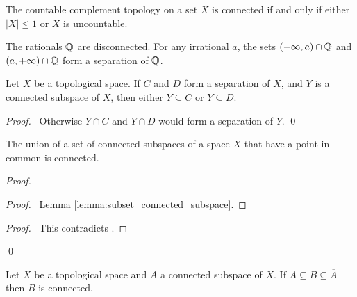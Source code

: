 \begin{example}
    The countable complement topology on a set $X$ is connected if and only if either $|X| \leq 1$ or $X$ is uncountable.
\end{example}

\begin{example}
    The rationals $\mathbb{Q}$ are disconnected. For any irrational $a$, the sets $(- \infty, a) \cap \mathbb{Q}$ and $(a, + \infty) \cap \mathbb{Q}$ form a separation of $\mathbb{Q}$.
\end{example}

\begin{lemma}
    \label{lemma:subset_connected_subspace}
    Let $X$ be a topological space. If $C$ and $D$ form a separation of $X$, and $Y$ is a connected subspace of $X$, then either $Y \subseteq C$ or $Y \subseteq D$.
\end{lemma}

\begin{proof}
    \pf\ Otherwise $Y \cap C$ and $Y \cap D$ would form a separation of $Y$. \qed
\end{proof}

\begin{theorem}
    \label{theorem:connected_union}
    The union of a set of connected subspaces of a space $X$ that have a point in common is connected.
\end{theorem}

\begin{proof}
    \pf
    \begin{proof}
        \pf\ Lemma \ref{lemma:subset_connected_subspace}.
    \end{proof}
    \qedstep
    \begin{proof}
        \pf\ This contradicts .
    \end{proof}
    \qed
\end{proof}

\begin{theorem}
    \label{theorem:connected_closure}
    Let $X$ be a topological space and $A$ a connected subspace of $X$. If $A \subseteq B \subseteq \overline{A}$ then $B$ is connected.
\end{theorem}

